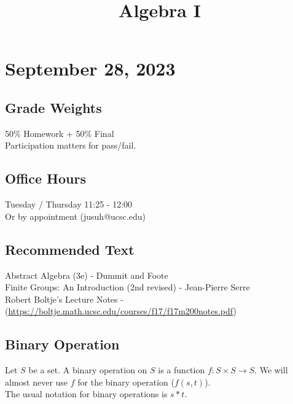 \documentclass[11pt]{article}
\date{}
\title{Algebra I}
\newcommand{\0}{\emptyset}
\begin{document}
\maketitle
\section*{September 28, 2023}
\label{sec:org2ae1aa5}
\subsection*{Grade Weights}
\label{sec:org523807a}
50\% Homework + 50\% Final\\[0pt]
Participation matters for pass/fail.\\[0pt]
\subsection*{Office Hours}
\label{sec:org9dd5094}
Tuesday / Thursday 11:25 - 12:00\\[0pt]
Or by appointment (jusuh@ucsc.edu)\\[0pt]
\subsection*{Recommended Text}
\label{sec:orge7ae8ec}
Abstract Algebra (3e) - Dummit and Foote\\[0pt]
Finite Groups: An Introduction (2nd revised) - Jean-Pierre Serre\\[0pt]
Robert Boltje's Lecture Notes - (\url{https://boltje.math.ucsc.edu/courses/f17/f17m200notes.pdf})\\[0pt]
\subsection*{Binary Operation}
\label{sec:org483faf5}
Let \(S\) be a set. A binary operation on \(S\) is a function \(f:S\times S\to S\). We will almost never use \(f\) for the binary operation (\(f(s,t)\)).\\[0pt]
The usual notation for binary operations is \(s*t\).\\[0pt]
\end{document}

